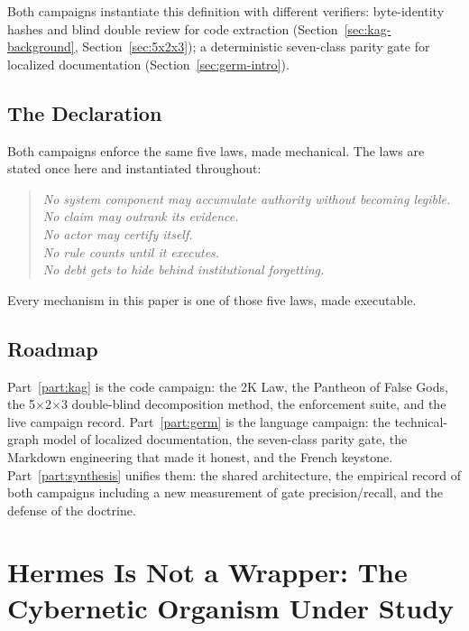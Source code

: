 \documentclass[11pt]{article}
\theoremstyle{definition}
\theoremstyle{plain}
\theoremstyle{remark}
\begin{document}
Both campaigns instantiate this definition with different verifiers:
byte-identity hashes and blind double review for code extraction
(Section~\ref{sec:kag-background}, Section~\ref{sec:5x2x3}); a deterministic
seven-class parity gate for localized documentation
(Section~\ref{sec:germ-intro}).

\subsection{The Declaration}

Both campaigns enforce the same five laws, made mechanical. The laws are
stated once here and instantiated throughout:

\begin{quote}
\emph{No system component may accumulate authority without becoming legible.}\\
\emph{No claim may outrank its evidence.}\\
\emph{No actor may certify itself.}\\
\emph{No rule counts until it executes.}\\
\emph{No debt gets to hide behind institutional forgetting.}
\end{quote}

Every mechanism in this paper is one of those five laws, made executable.

\subsection{Roadmap}

Part~\ref{part:kag} is the code campaign: the 2K Law, the Pantheon of False
Gods, the 5$\times$2$\times$3 double-blind decomposition method, the
enforcement suite, and the live campaign record. Part~\ref{part:germ} is the
language campaign: the technical-graph model of localized documentation, the
seven-class parity gate, the Markdown engineering that made it honest, and
the French keystone. Part~\ref{part:synthesis} unifies them: the shared
architecture, the empirical record of both campaigns including a new
measurement of gate precision/recall, and the defense of the doctrine.


\section{Hermes Is Not a Wrapper: The Cybernetic Organism Under Study}
\label{sec:hermes}
\end{document}

